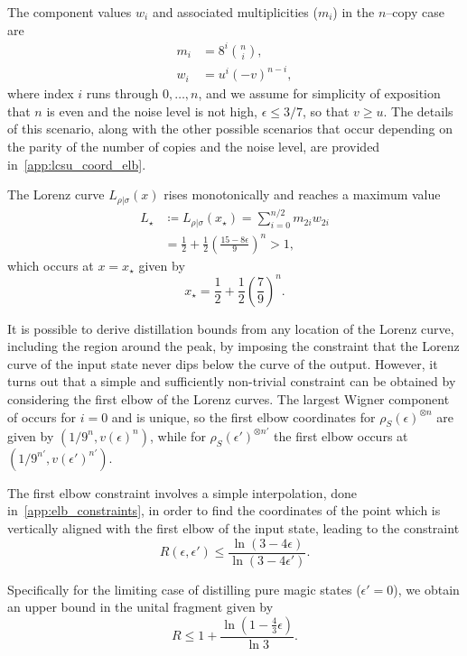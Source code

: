 \documentclass[pra,
aps,
twocolumn,
superscriptaddress,
groupedaddress,
nofootinbib,
reprint
]{revtex4-1}
\begin{document}
The component values $w_i$ and associated multiplicities ($m_i$) in the $n$--copy case are 
\begin{align}
	m_i &= 8^{i}\binom{n}{i}, \\
	w_i &= u^{i}(-v)^{n-i},
\end{align}
where index $i$ runs through $0, \dots, n$, and we assume for simplicity of exposition that $n$ is even and the noise level is not high, $\epsilon \leq 3/7$, so that $v \geq u$.
The details of this scenario, along with the other possible scenarios that occur depending on the parity of the number of copies and the noise level, are provided in~\cref{app:lcsu_coord_elb}.

The Lorenz curve $L_{\rho|\sigma}(x)$ rises monotonically and reaches a maximum value
\begin{align}\label{eq:lcsu_max}
	L_\star &\coloneqq L_{\rho |\sigma} (x_\star) = \sum_{i = 0}^{n/2} m_{2i} w_{2i} \nonumber\\
	&= \frac{1}{2} + \frac{1}{2}\left(\frac{15 - 8\epsilon}{9}\right)^n > 1,
\end{align}
which occurs at $x=x_\star$ given by
\begin{equation}
	x_\star = \frac{1}{2} + \frac{1}{2}\left(\frac{7}{9}\right)^n.
\end{equation}

It is possible to derive distillation bounds from any location of the Lorenz curve, including the region around the peak, by imposing the constraint that the Lorenz curve of the input state never dips below the curve of the output.
However, it turns out that a simple and sufficiently non-trivial constraint can be obtained by considering the first elbow of the Lorenz curves. 
The largest Wigner component of occurs for $i=0$ and is unique, so the first elbow coordinates for $\rho_S(\epsilon)^{\otimes n}$ are given by $(1/9^n, v(\epsilon)^n)$, while for $\rho_S(\epsilon')^{\otimes n'}$ the first elbow occurs at $(1/9^{n'}, v(\epsilon')^{n'})$.

The first elbow constraint involves a simple interpolation, done in~\cref{app:elb_constraints}, in order to find the coordinates of the point which is vertically aligned with the first elbow of the input state, leading to the constraint
\begin{equation}
	R(\epsilon, \epsilon') \leq \frac{\ln{(3-4\epsilon)}}{\ln{(3-4\epsilon')}}.
\end{equation}

Specifically for the limiting case of distilling pure magic states ($\epsilon'=0$), we obtain an upper bound in the unital fragment given by
\begin{equation}
	R \leq 1 + \frac{\ln (1 - \frac{4}{3} \epsilon)}{\ln 3}.
\end{equation}
\end{document}

